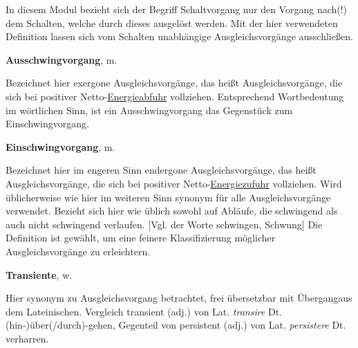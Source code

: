 {\begin{frame}
        In diesem Modul bezieht sich der Begriff Schaltvorgang nur den Vorgang nach(!) dem Schalten, welche durch dieses ausgelöst werden.
        Mit der hier verwendeten Definition lassen sich vom Schalten unabhängige Ausgleichsvorgänge ausschließen. 


    \textbf{Ausschwingvorgang}, m.

        Bezeichnet hier exergone Ausgleichsvorgänge, das heißt Ausgleichsvorgänge, die sich bei positiver Netto-\underline{Energieabfuhr} vollziehen. 
        Entsprechend Wortbedeutung im wörtlichen Sinn, ist ein Ausschwingvorgang das Gegenstück zum Einschwingvorgang.

    \textbf{Einschwingvorgang}, m.

        Bezeichnet hier im engeren Sinn endergone Ausgleichsvorgänge, das heißt Ausgleichsvorgänge, die sich bei positiver Netto-\underline{Energiezufuhr} vollziehen. 
        Wird üblicherweise wie hier im weiteren Sinn synonym für alle Ausgleichsvorgänge verwendet.
        Bezieht sich hier wie üblich sowohl auf Abläufe, die schwingend als auch nicht schwingend verlaufen. [Vgl. der Worte schwingen, Schwung]
        Die Definition ist gewählt, um eine feinere Klassifizierung möglicher Ausgleichsvorgänge zu erleichtern.
    
    \textbf{Transiente}, w. %

        Hier synonym zu Ausgleichsvorgang betrachtet, frei übersetzbar mit \glqq Übergang\grqq aus dem Lateinischen.
        Vergleich transient (adj.) von Lat. \textit{transire} Dt. (hin-)über(/durch)-gehen, 
	    Gegenteil von persistent (adj.) von Lat. \textit{persistere} Dt. verharren.

\end{frame}
}%


